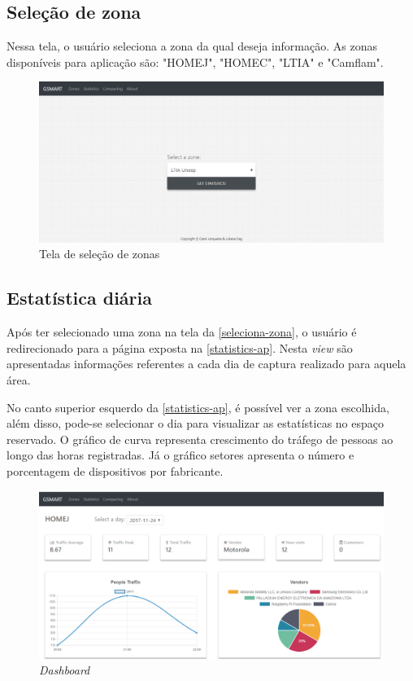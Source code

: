 \subsection{Seleção de zona}
\label{seleciona-zona}
Nessa tela, o usuário seleciona a zona da qual deseja informação. As zonas disponíveis para aplicação são:
"HOMEJ", "HOMEC", "LTIA" e "Camflam".

\begin{figure}[!h]
  \caption{\label{zones-ap}Tela de seleção de zonas}
  \begin{center}
    \includegraphics[width=1.0\textwidth]{img/zones.png}
  \end{center}
\end{figure}

\subsection{Estatística diária}
Após ter selecionado uma zona na tela da \autoref{seleciona-zona}, o usuário é
redirecionado para a página exposta na \autoref{statistics-ap}. Nesta
\emph{view} são apresentadas informações referentes a cada dia de captura
realizado para aquela área.

No canto superior esquerdo da \autoref{statistics-ap}, é possível ver a zona
escolhida, além disso, pode-se selecionar o dia para visualizar as estatísticas
no espaço reservado. O gráfico de curva representa crescimento do tráfego de pessoas ao longo das
horas registradas. Já o gráfico setores apresenta o número e porcentagem de dispositivos por fabricante.

\begin{figure}[!h]
  \caption{\label{statistics-ap}\emph{Dashboard}}
  \begin{center}
    \includegraphics[width=1.0\textwidth]{img/statistics.png}
  \end{center}
\end{figure}

